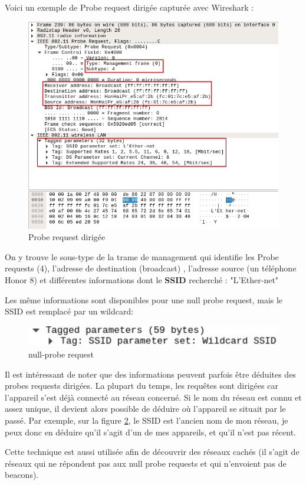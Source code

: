 Voici un exemple de Probe request dirigée capturée avec Wireshark :
\begin{figure}[H]
	\centering
	\includegraphics[width=14cm]{images/probe/directed_probe.png}
	\caption{Probe request dirigée}
	\label{fig:directedprobe}
\end{figure}

On y trouve le sous-type de la trame de management qui identifie les Probe requests (4), l'adresse de destination (broadcast)
, l'adresse source (un téléphone Honor 8) et différentes informations dont le \textbf{SSID} recherché : "L'Ether-net"

Les même informations sont disponibles pour une null probe request, mais le SSID est remplacé par un wildcard:
\begin{figure}[H]
	\centering
	\includegraphics[width=14cm]{images/probe/null_probe_cropped.png}
	\caption{null-probe request}
	\label{fig:directedprobe}
\end{figure}

Il est intéressant de noter que des informations peuvent parfois être déduites des probes requests dirigées.
La plupart du temps, les requêtes sont dirigées car l'appareil s'est déjà connecté au réseau concerné. 
Si le nom du réseau est connu et assez unique, il devient alors possible de déduire où l'appareil se situait par le passé.
Par exemple, sur la figure \ref{fig:directedprobe}, le SSID est l'ancien nom de mon réseau, je peux donc en déduire qu'il s'agit
d'un de mes appareils, et qu'il n'est pas récent. 

Cette technique est aussi utilisée afin de découvrir des réseaux cachés (il s'agit de réseaux qui ne répondent pas aux null probe requests et qui n'envoient pas de beacons).

